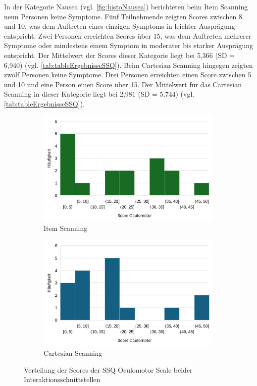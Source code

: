 In der Kategorie Nausea (vgl. \autoref{fig:histoNausea}) berichteten beim Item Scanning neun Personen keine Symptome. Fünf Teilnehmende zeigten Scores zwischen 8 und 10, was dem Auftreten eines einzigen Symptoms in leichter Ausprägung entspricht. Zwei Personen erreichten Scores über 15, was dem Auftreten mehrerer Symptome oder mindestens einem Symptom in moderater bis starker Ausprägung entspricht. Der Mittelwert der Scores dieser Kategorie liegt bei 5,366 (SD = 6,940) (vgl. \autoref{tab:tableErgebnisseSSQ}). Beim Cartesian Scanning hingegen zeigten zwölf Personen keine Symptome. Drei Personen erreichten einen Score zwischen 5 und 10 und eine Person einen Score über 15. Der Mittelwert für das Cartesian Scanning in dieser Kategorie liegt bei 2,981 (SD = 5,744) (vgl. \autoref{tab:tableErgebnisseSSQ}).

\begin{figure}
    \centering
    \begin{subfigure}{.5\textwidth}
        \centering
        \includegraphics[width=0.99\textwidth]{images/Results/Histogramm-Oculomotor-Scale-Item.png}
        \caption{Item Scanning}
        \label{fig:histoOculomotorItem}   
    \end{subfigure}%
    \begin{subfigure}{.5\textwidth}
        \centering
        \includegraphics[width=0.99\textwidth]{images/Results/Histogramm-Oculomotor-Scale-Cartesian.png}
         \caption{Cartesian Scanning}
         \label{fig:histoOculomotorCartesian}
    \end{subfigure}
    \caption{Verteilung der Scores der SSQ Oculomotor Scale beider Interaktionsschnittstellen}
    \label{fig:histoOculomotor}
\end{figure}


